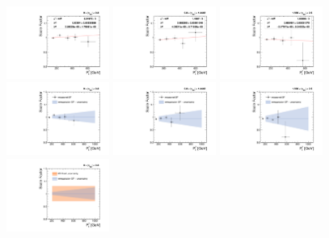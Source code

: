 \begin{figure}[!htbp]
  \centering
  \includegraphics[width=0.3\textwidth]{fig/Extrapolate_2018_0_Fit.pdf}
  \includegraphics[width=0.3\textwidth]{fig/Extrapolate_2018_1_Fit.pdf}
  \includegraphics[width=0.3\textwidth]{fig/Extrapolate_2018_2_Fit.pdf}\\
  \includegraphics[width=0.3\textwidth]{fig/Extrapolate_2018_0_Check.pdf}
  \includegraphics[width=0.3\textwidth]{fig/Extrapolate_2018_1_Check.pdf}
  \includegraphics[width=0.3\textwidth]{fig/Extrapolate_2018_2_Check.pdf}\\
  \includegraphics[width=0.3\textwidth]{fig/Extrapolate_2018_0_Compare.pdf}

\end{figure}
